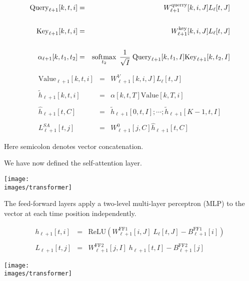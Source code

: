 {{\huge
\begin{eqnarray*}
\mathrm{Query}_{\ell+1}[k,t,i] & = & W^\mathrm{querry}_{\ell+1}[k,i,J]L_\ell[t,J] \\
\\
\mathrm{Key}_{\ell+1}[k,t,i] & = &  W^\mathrm{key}_{\ell+1}[k,i,J]L_\ell[t,J] \\
\\
\alpha_{\ell+1}[k,t_1,t_2] & = & \operatorname*{softmax}_{t_2}\; \frac{1}{\sqrt{I}}\;\mathrm{Query}_{\ell+1}[k,t_1,I]\mathrm{Key}_{\ell+1}[k,t_2,I]
\end{eqnarray*}
}

      
\begin{eqnarray*}
\mathrm{Value}_{\ell+1}[k,t,i] & = & W^V_{\ell+1}[k,i,J]L_\ell[t,J] \\
\\
\tilde{h}_{\ell+1}[k,t,i] & = & \alpha[k,t,T]\mathrm{Value}[k,T,i] \\
\\
\hat{h}_{\ell+1}[t,C] & = & \tilde{h}_{\ell+1}[0,t,I];\cdots;\tilde{h}_{\ell+1}[K-1,t,I] \\
\\
L^{SA}_{\ell+1}[t,j] & = & W^0_{\ell+1}[j,C]\hat{h}_{\ell+1}[t,C]
\end{eqnarray*}

\vfill
Here semicolon denotes vector concatenation.


We have now defined the self-attention layer.
\vfill
\centerline{\texttt{[image: \\images/transformer]}}


The feed-forward layers apply a two-level multi-layer perceptron (MLP) to the vector at each time position independently.

\vfill

\begin{eqnarray*}
h_{\ell+1}[t,i] & = & \mathrm{ReLU}(W^{\mathrm{FF1}}_{\ell+1}[i,J]\;L_\ell[t,J] - B^{\mathrm{FF1}}_{\ell+1}[i]) \\
\\
L_{\ell+1}[t,j] & = & W^{\mathrm{FF2}}_{\ell+1}[j,I]\;h_{\ell+1}[t,I] - B^\mathrm{FF2}_{\ell+1}[j]
\end{eqnarray*}


\centerline{\texttt{[image: \\images/transformer]}}

}
